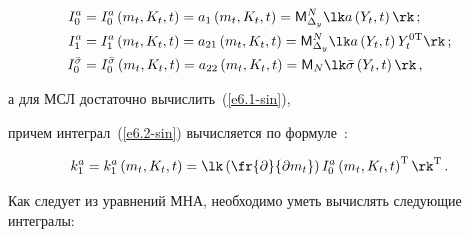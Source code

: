   \begin{align}

  I_0^a &= I_0^a \left(m_t, K_t, t\right) = 

    a_1 \left(m_t, K_t, t\right)= {\sf M}_{\Delta_y}^N \lk a\left(Y_t, t\right)\rk\,;

    \label{e6.1-sin}

    \\

    I_1^a &= I_1^a \left(m_t, K_t, t\right)= 

    a_{21}\left(m_t, K_t, t\right)= {\sf M}_{\Delta_y}^N \lk 

    a\left(Y_t , t\right) Y_t^{0\mathrm{T}}\rk\,;

    \label{e6.2-sin}

\\

    I_0^{\bar \sigma} &= I_0^{\bar \sigma} \left(m_t, K_t, t\right) = 

    a_{22}\left(m_t, K_t, t\right) = {\sf M}_N \lk \bar \sigma \left(Y_t, t\right)\rk\,,\notag


    \end{align}

а для МСЛ достаточно вычислить~(\ref{e6.1-sin}), 

причем интеграл~(\ref{e6.2-sin}) вычисляется по формуле~\cite{1-sin, 6-sin, 7-sin}:

   \begin{equation*}

    k_1^a = k_1^a \left(m_t, K_t, t\right)=\lk \left( 

    \fr{\partial}{\partial m_t}\right) I_0^a 

    \left(m_t, K_t, t\right)^{\mathrm{T}}\rk^{\mathrm{T}}\,.


    \end{equation*}



Как следует из уравнений МНА, необходимо уметь вычислять следующие интегралы:

